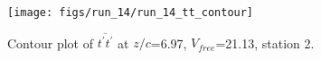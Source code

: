 \begin{figure}[H]
\centering
\texttt{[image: figs/run\_14/run\_14\_tt\_contour]}
\caption{Contour plot of $\overline{t^\prime t^\prime}$ at $z/c$=6.97, $V_{free}$=21.13, station 2.}
\label{fig:run_14_tt_contour}
\end{figure}


